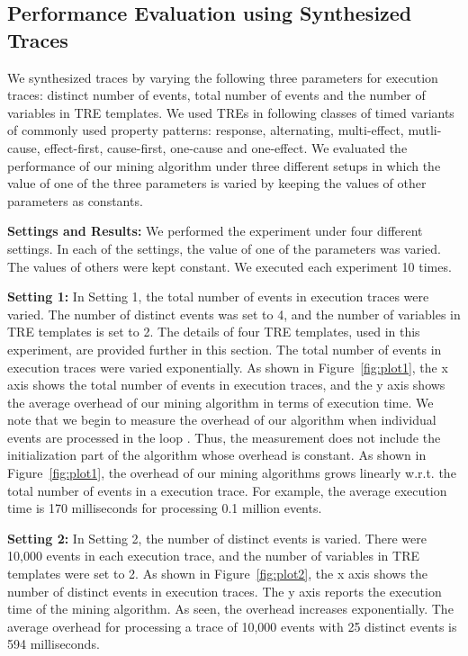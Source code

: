 \documentclass[]{sigplanconf}
\begin{document}
\subsection{Performance Evaluation using Synthesized Traces}
We synthesized traces by varying the following three parameters for execution traces: distinct number of events, total number of events and the number of variables in TRE templates. We used TREs in following classes of timed variants of commonly used property patterns: response, alternating, multi-effect, mutli-cause, effect-first, cause-first, one-cause and one-effect. We evaluated the performance of our mining algorithm under three different setups in which the value of one of the three parameters is varied by keeping the values of other parameters as constants.

\noindent \textbf{Settings and Results:} We performed the experiment under four different settings. In each of the settings, the value of one of the parameters was varied. The values of others were kept constant. We executed each experiment 10 times.

\noindent \textbf{Setting 1:}
In Setting 1, the total number of events in execution traces were varied. The number of distinct events was set to 4, and the number of variables in TRE templates is set to 2. The details of four TRE templates, used in this experiment, are provided further in this section. The total number of events in execution traces were varied exponentially. As shown in Figure~\ref{fig:plot1}, the x axis shows the total number of events in execution traces, and the y axis shows the average overhead of our mining algorithm in terms of execution time. We note that we begin to measure the overhead of our algorithm when individual events are processed in the loop . Thus, the measurement does not include the initialization part of the algorithm whose overhead is constant. As shown in Figure~\ref{fig:plot1}, the overhead of our mining algorithms grows linearly w.r.t. the total number of events in a execution trace. For example, the average execution time is 170 milliseconds for processing 0.1 million events.

\noindent \textbf{Setting 2:}
In Setting 2, the number of distinct events is varied. There were 10,000 events in each execution trace, and the number of variables in TRE templates were set to 2. As shown in Figure~\ref{fig:plot2}, the x axis shows the number of distinct events in execution traces. The y axis reports the execution time of the mining algorithm. As seen, the overhead increases exponentially. The average overhead for processing a trace of 10,000 events with 25 distinct events is 594 milliseconds.
\end{document}
